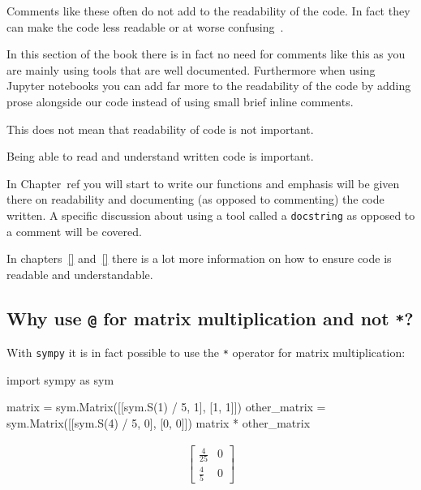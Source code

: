 Comments like these often do not add to the readability of the code. In fact
they can make the code less readable or at worse
confusing~\cite{martin2009clean}.

In this section of the book there is in fact no need for comments like this as
you are mainly using tools that are well documented. Furthermore when using
Jupyter notebooks you can add far more to the readability of the code by adding
prose alongside our code instead of using small brief inline comments.

This does not mean that readability of code is not important.


\begin{note}
Being able to read and understand written code is important.
\end{note}



In Chapter~ref{}
you will start to write our functions and emphasis will
be given there on readability and documenting (as opposed to commenting) the
code written. A specific discussion about using a tool called a
\texttt{docstring} as opposed to a comment will be covered.


In chapters~\ref{} and~\ref{} there is a lot more
information on how to ensure code is readable and understandable.


\subsection{Why use \texttt{@} for matrix multiplication and not \texttt{*}?}
\label{\detokenize{tools-for-mathematics/04-matrices/why/main:why-do-we-use-for-matrix-multiplication-and-not}}

With \texttt{sympy} it is in fact possible to use the \texttt{*} operator for matrix
multiplication:

\begin{pyin}
import sympy as sym

matrix = sym.Matrix([[sym.S(1) / 5, 1], [1, 1]])
other_matrix = sym.Matrix([[sym.S(4) / 5, 0], [0, 0]])
matrix * other_matrix
\end{pyin}




\begin{equation*}
\begin{split}\displaystyle \left[\begin{matrix}\frac{4}{25} & 0\\\frac{4}{5} & 0\end{matrix}\right]\end{split}
\end{equation*}




